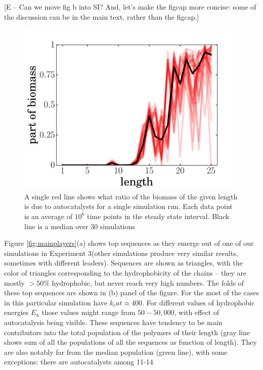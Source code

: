 \documentclass[journal=jacsat,manuscript=article,layout=twocolumn]{achemso}
\begin{document}
[E -- Can we move fig b into SI?  And, let's make the figcap more concise: some of the discussion can be in the main text, rather than the figcap.]


\begin{figure}[h!]
  \centering
  \includegraphics[width=\columnwidth]{pictures/biomass.pdf} 
  \caption{\footnotesize{A single red line shows what ratio of the biomass of the 
given length is due to autocatalysts for a single simulation run. Each data point is an average of 
$10^6$ time points in the steady state interval. Black line is a median over 30 simulations }}
  \label{fig:biomass}
\end{figure}
Figure \ref{fig:mainplayers}(a) shows top sequences as they emerge out of one of our 
simulations in Experiment 3(other simulations produce very similar results, sometimes with 
different leaders). Sequences are shown as triangles, with the color of triangles 
corresponding to the hydrophobicity of the chains -- they are mostly $>50\%$ hydrophobic, but 
never reach very high numbers. The folds of these top sequences are shown in 
(b) panel of the figure. For the most of the cases in this particular simulation have 
$k_cat\approx400$. For different values of hydrophobic energies $E_h$ those values might range 
from $50-50,000$, with effect of autocatalysis being visible. These sequences have tendency to be 
main contributors into the total population of the polymers of their length (gray line shows sum 
of all the populations of all the sequences as function of length). They are also notably far from 
the median population (green line), with some exceptions: there are autocatalysts among 11-14 
\end{document}
